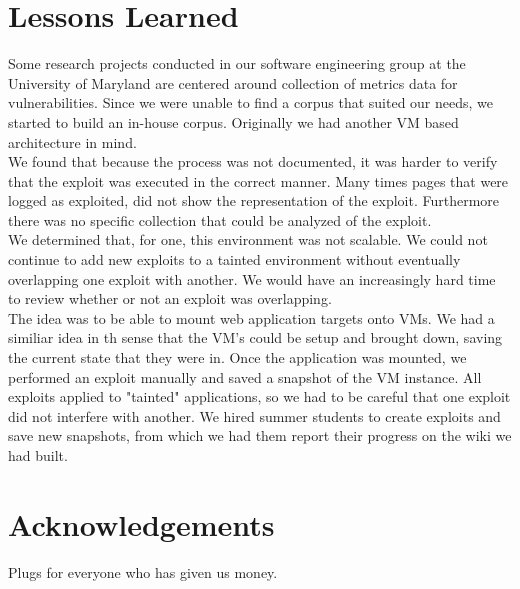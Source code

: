 \documentclass[letterpaper,twocolumn,10pt]{article}
\begin{document}
\section{Lessons Learned}

Some research projects conducted in our software engineering group at the University of Maryland are centered around collection of metrics data for vulnerabilities.  Since we were unable to find a corpus that suited our needs, we started to build an in-house corpus.  Originally we had another VM based architecture in mind. \\

We found that because the process was not documented, it was harder to verify that the exploit was executed in the correct manner.  Many times pages that were logged as exploited, did not show the representation of the exploit.  Furthermore there was no specific collection that could be analyzed of the exploit.\\

We determined that, for one, this environment was not scalable.  We could not continue to add new exploits to a tainted environment without eventually overlapping one exploit with another.  We would have an increasingly hard time to review whether or not an exploit was overlapping.\\

The idea was to be able to mount web application targets onto VMs.  We had a similiar idea in th sense that the VM's could be setup and brought down, saving the current state that they were in.  Once the application was mounted, we performed an exploit manually and saved a snapshot of the VM instance.  All exploits applied to "tainted" applications, so we had to be careful that one exploit did not interfere with another.  We hired summer students to create exploits and save new snapshots, from which we had them report their progress on the wiki we had built.  


\section{Acknowledgements}

Plugs for everyone who has given us money.
\end{document}
